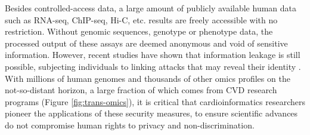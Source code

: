 \documentclass[letter]{bib}
\begin{document}
    Besides controlled-access data, a large amount of publicly available human data such as RNA-seq, ChIP-seq, Hi-C, etc. results are freely accessible with no restriction. Without genomic sequences, genotype or phenotype data, the processed output of these assays are deemed anonymous and void of sensitive information. However, recent studies have shown that information leakage is still possible, subjecting individuals to linking attacks that may reveal their identity \citep{Harmanci:2016:Quantification, Harmanci:2018:Analysis}.  With millions of human genomes and thousands of other omics profiles on the not-so-distant horizon, a large fraction of which comes from CVD research programs (Figure \ref{fig:trans-omics}), it is critical that cardioinformatics researchers pioneer the applications of these security measures, to ensure scientific advances do not compromise human rights to privacy and non-discrimination.
	
\end{document}
